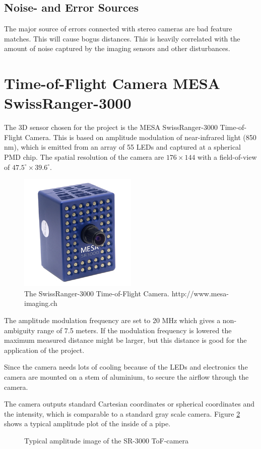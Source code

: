 \subsection{Noise- and Error Sources}
The major source of errors connected with stereo cameras are bad feature matches. This
will cause bogus distances. This is heavily correlated with the amount of noise captured
by the imaging sensors and other disturbances.




\section{Time-of-Flight Camera MESA SwissRanger-3000}
The 3D sensor chosen for the project is the MESA SwissRanger-3000 Time-of-Flight Camera.
This is based on amplitude modulation of near-infrared light (850 nm), which is emitted from an
array of 55 LEDs and captured at a spherical PMD chip. The spatial resolution of the camera
are $176\times144$ with a field-of-view of $47.5^\circ \times 39.6^\circ$. 
\begin{figure}[htbp]
    \centering
    \includegraphics[width=0.5\textwidth]{pics/sr3000}
    \caption{The SwissRanger-3000 Time-of-Flight Camera. http://www.mesa-imaging.ch}
    \label{chap3:fig-sr3000}
\end{figure}
The amplitude modulation frequency are set to 20 MHz which gives a non-ambiguity range of
7.5 meters. If the modulation frequency is lowered the maximum measured distance might be
larger, but this distance is good for the application of the project. 

Since the camera needs lots of cooling because of the LEDs and electronics the camera are
mounted on a stem of aluminium, to secure the airflow through the camera. 

The camera outputs standard Cartesian coordinates or spherical coordinates and the
intensity, which is comparable to a standard gray scale camera. Figure 
\ref{chap3:fig-tof-amppicture} shows a typical amplitude plot of the inside of a pipe.
\begin{figure}[htbp]
    \centering
    \caption{Typical amplitude image of the SR-3000 ToF-camera}
    \label{chap3:fig-tof-amppicture}
\end{figure}


